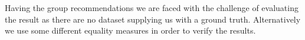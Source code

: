 Having the group recommendations we are faced with the challenge of evaluating the result as there are no dataset supplying us with a ground truth. Alternatively we use some different equality measures in order to verify the results. 








